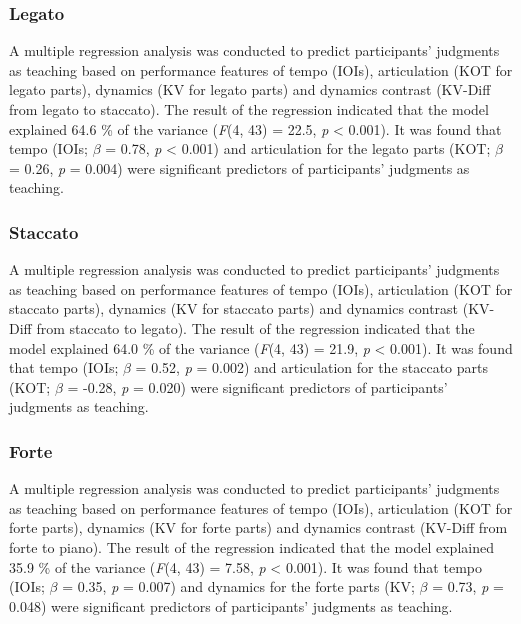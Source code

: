 \documentclass[
  man,floatsintext]{apa6}
\begin{document}
\hypertarget{legato}{%
\subsubsection{Legato}\label{legato}}

A multiple regression analysis was conducted to predict participants' judgments as teaching based on performance features of tempo (IOIs), articulation (KOT for legato parts), dynamics (KV for legato parts) and dynamics contrast (KV-Diff from legato to staccato). The result of the regression indicated that the model explained 64.6 \% of the variance (\emph{F}(4, 43) = 22.5, \emph{p} \textless{} 0.001). It was found that tempo (IOIs; \emph{\(\beta\)} = 0.78, \emph{p} \textless{} 0.001) and articulation for the legato parts (KOT; \emph{\(\beta\)} = 0.26, \emph{p} = 0.004) were significant predictors of participants' judgments as teaching.

\hypertarget{staccato}{%
\subsubsection{Staccato}\label{staccato}}

A multiple regression analysis was conducted to predict participants' judgments as teaching based on performance features of tempo (IOIs), articulation (KOT for staccato parts), dynamics (KV for staccato parts) and dynamics contrast (KV-Diff from staccato to legato). The result of the regression indicated that the model explained 64.0 \% of the variance (\emph{F}(4, 43) = 21.9, \emph{p} \textless{} 0.001). It was found that tempo (IOIs; \emph{\(\beta\)} = 0.52, \emph{p} = 0.002) and articulation for the staccato parts (KOT; \emph{\(\beta\)} = -0.28, \emph{p} = 0.020) were significant predictors of participants' judgments as teaching.

\hypertarget{forte}{%
\subsubsection{Forte}\label{forte}}

A multiple regression analysis was conducted to predict participants' judgments as teaching based on performance features of tempo (IOIs), articulation (KOT for forte parts), dynamics (KV for forte parts) and dynamics contrast (KV-Diff from forte to piano). The result of the regression indicated that the model explained 35.9 \% of the variance (\emph{F}(4, 43) = 7.58, \emph{p} \textless{} 0.001). It was found that tempo (IOIs; \emph{\(\beta\)} = 0.35, \emph{p} = 0.007) and dynamics for the forte parts (KV; \emph{\(\beta\)} = 0.73, \emph{p} = 0.048) were significant predictors of participants' judgments as teaching.
\end{document}
